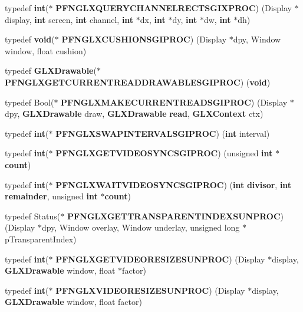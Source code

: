 \begin{DoxyCompactItemize}
\item 
typedef {\bf int}($\ast$ {\bf P\+F\+N\+G\+L\+X\+Q\+U\+E\+R\+Y\+C\+H\+A\+N\+N\+E\+L\+R\+E\+C\+T\+S\+G\+I\+X\+P\+R\+OC}) (Display $\ast$display, {\bf int} screen, {\bf int} channel, {\bf int} $\ast$dx, {\bf int} $\ast$dy, {\bf int} $\ast$dw, {\bf int} $\ast$dh)
\item 
typedef {\bf void}($\ast$ {\bf P\+F\+N\+G\+L\+X\+C\+U\+S\+H\+I\+O\+N\+S\+G\+I\+P\+R\+OC}) (Display $\ast$dpy, Window window, float cushion)
\item 
typedef {\bf G\+L\+X\+Drawable}($\ast$ {\bf P\+F\+N\+G\+L\+X\+G\+E\+T\+C\+U\+R\+R\+E\+N\+T\+R\+E\+A\+D\+D\+R\+A\+W\+A\+B\+L\+E\+S\+G\+I\+P\+R\+OC}) ({\bf void})
\item 
typedef Bool($\ast$ {\bf P\+F\+N\+G\+L\+X\+M\+A\+K\+E\+C\+U\+R\+R\+E\+N\+T\+R\+E\+A\+D\+S\+G\+I\+P\+R\+OC}) (Display $\ast$dpy, {\bf G\+L\+X\+Drawable} draw, {\bf G\+L\+X\+Drawable} {\bf read}, {\bf G\+L\+X\+Context} ctx)
\item 
typedef {\bf int}($\ast$ {\bf P\+F\+N\+G\+L\+X\+S\+W\+A\+P\+I\+N\+T\+E\+R\+V\+A\+L\+S\+G\+I\+P\+R\+OC}) ({\bf int} interval)
\item 
typedef {\bf int}($\ast$ {\bf P\+F\+N\+G\+L\+X\+G\+E\+T\+V\+I\+D\+E\+O\+S\+Y\+N\+C\+S\+G\+I\+P\+R\+OC}) (unsigned {\bf int} $\ast${\bf count})
\item 
typedef {\bf int}($\ast$ {\bf P\+F\+N\+G\+L\+X\+W\+A\+I\+T\+V\+I\+D\+E\+O\+S\+Y\+N\+C\+S\+G\+I\+P\+R\+OC}) ({\bf int} {\bf divisor}, {\bf int} {\bf remainder}, unsigned {\bf int} $\ast${\bf count})
\item 
typedef Status($\ast$ {\bf P\+F\+N\+G\+L\+X\+G\+E\+T\+T\+R\+A\+N\+S\+P\+A\+R\+E\+N\+T\+I\+N\+D\+E\+X\+S\+U\+N\+P\+R\+OC}) (Display $\ast$dpy, Window overlay, Window underlay, unsigned long $\ast$p\+Transparent\+Index)
\item 
typedef {\bf int}($\ast$ {\bf P\+F\+N\+G\+L\+X\+G\+E\+T\+V\+I\+D\+E\+O\+R\+E\+S\+I\+Z\+E\+S\+U\+N\+P\+R\+OC}) (Display $\ast$display, {\bf G\+L\+X\+Drawable} window, float $\ast$factor)
\item 
typedef {\bf int}($\ast$ {\bf P\+F\+N\+G\+L\+X\+V\+I\+D\+E\+O\+R\+E\+S\+I\+Z\+E\+S\+U\+N\+P\+R\+OC}) (Display $\ast$display, {\bf G\+L\+X\+Drawable} window, float factor)
\end{DoxyCompactItemize}
